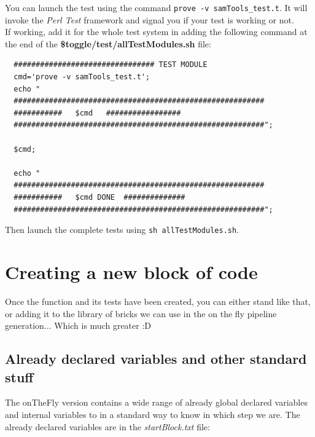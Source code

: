\documentclass[a4paper,10pt]{report}
\begin{document}
You can launch the test using the command \texttt{prove -v samTools\_test.t}. It will invoke the \textit{Perl Test} framework and signal you if your test is working or not. \\

If working, add it for the whole test system in adding the following command at the end of the \textbf{\$toggle/test/allTestModules.sh} file:

\begin{lstlisting}
  ################################ TEST MODULE
  cmd='prove -v samTools_test.t';
  echo "
  #########################################################
  ###########   $cmd   #################
  #########################################################";

  $cmd;

  echo " 
  ######################################################### 
  ###########   $cmd DONE  ##############  
  #########################################################";  

\end{lstlisting}
Then launch the complete tests using \texttt{sh allTestModules.sh}.



\chapter{Creating a new block of code}
Once the function and its tests have been created, you can either stand like that, or adding it to the library of bricks we can use in the on the fly pipeline generation... Which is much greater :D

\section{Already declared variables and other standard stuff}

The onTheFly version contains a wide range of already global declared variables and internal variables to in a standard way to know in which step we are. The already declared variables are in the \emph{startBlock.txt} file:
\end{document}
